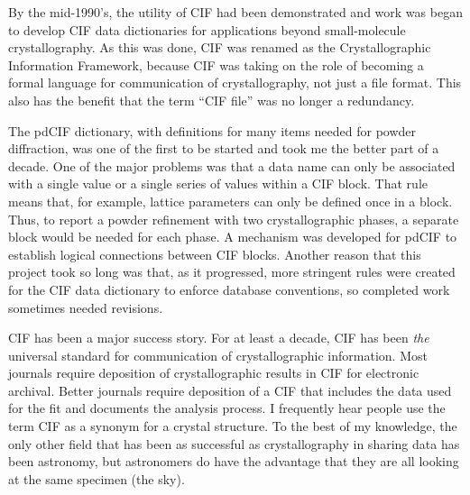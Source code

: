 By the mid-1990's, the utility of CIF had been demonstrated and work was began to develop CIF data dictionaries for applications beyond small-molecule crystallography. As this was done, CIF was renamed as the Crystallographic Information Framework, because CIF was taking on the role of becoming a formal language for communication of crystallography, not just a file format. This also has the benefit that the term ``CIF file'' was no longer a redundancy. 

The pdCIF dictionary, with definitions for many items needed for powder diffraction, was one of the first to be started and took me the better part of a decade. One of the major problems was that a data name can only be associated with a single value or a single series of values within a CIF block. 
That rule means that, for example, lattice parameters can only be defined once in a block. 
Thus, to report a powder refinement with two crystallographic phases, a separate block would be needed for each phase. A mechanism was developed for pdCIF to establish logical connections between CIF blocks. Another reason that this project took so long was that, as it progressed, more stringent rules were created for the CIF data dictionary to enforce database conventions, so completed work sometimes needed revisions. 

CIF has been a major success story. 
For at least a decade, CIF has been \textit{the} universal standard for communication of crystallographic information.
Most journals require deposition of crystallographic results in CIF for electronic archival. Better journals require deposition of a CIF that includes the data used for the fit and documents the analysis process.
I frequently hear people use the term CIF as a synonym for a crystal structure. To the best of my knowledge, the only other field that has been as successful as crystallography in sharing data has been astronomy, but astronomers do have the advantage that they are all looking at the same specimen (the sky).

